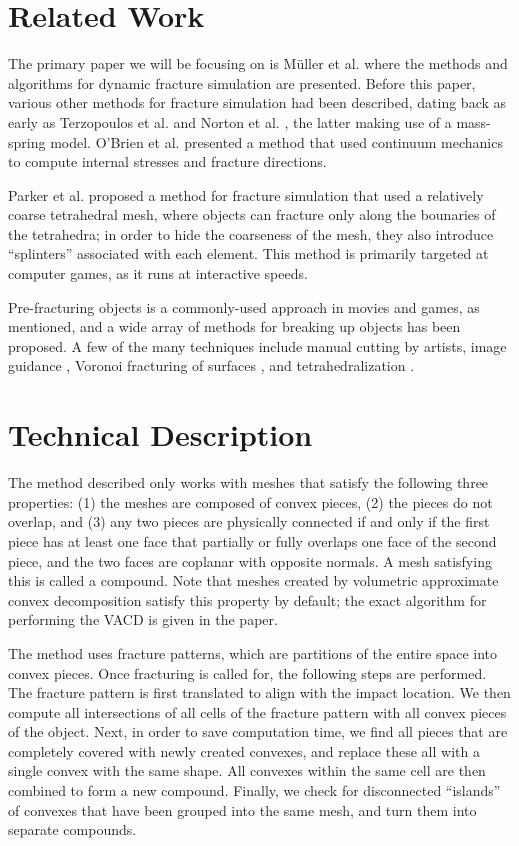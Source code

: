 \documentclass[tog]{acmsiggraph}
\begin{document}
\section{Related Work}

The primary paper we will be focusing on is M\"uller et
al. \cite{Mul13} where the methods and algorithms for dynamic fracture
simulation are presented. Before this paper, various other methods for
fracture simulation had been described, dating back as early as
Terzopoulos et al. \cite{Ter88} and Norton et al. \cite{Nor91}, the
latter making use of a mass-spring model. O'Brien et al. \cite{Obr99}
presented a method that used continuum mechanics to compute internal
stresses and fracture directions.

Parker et al. \cite{Par09} proposed a method for fracture simulation
that used a relatively coarse tetrahedral mesh, where objects can
fracture only along the bounaries of the tetrahedra; in order to hide
the coarseness of the mesh, they also introduce ``splinters''
associated with each element. This method is primarily targeted at
computer games, as it runs at interactive speeds.

Pre-fracturing objects is a commonly-used approach in movies and
games, as mentioned, and a wide array of methods for breaking up
objects has been proposed. A few of the many techniques include manual
cutting by artists, image guidance \cite{Mou05}, Voronoi fracturing of
surfaces \cite{Rag02}, and tetrahedralization \cite{Par09}.

\section{Technical Description}

The method described only works with meshes that satisfy the following
three properties: (1) the meshes are composed of convex pieces, (2)
the pieces do not overlap, and (3) any two pieces are physically
connected if and only if the first piece has at least one face that
partially or fully overlaps one face of the second piece, and the two
faces are coplanar with opposite normals. A mesh satisfying this is
called a compound. Note that meshes created by volumetric approximate
convex decomposition satisfy this property by default; the exact
algorithm for performing the VACD is given in the paper.

The method uses fracture patterns, which are partitions of the entire
space into convex pieces. Once fracturing is called for, the following
steps are performed. The fracture pattern is first translated to align
with the impact location. We then compute all intersections of all
cells of the fracture pattern with all convex pieces of the
object. Next, in order to save computation time, we find all pieces
that are completely covered with newly created convexes, and replace
these all with a single convex with the same shape. All convexes
within the same cell are then combined to form a new
compound. Finally, we check for disconnected ``islands'' of convexes
that have been grouped into the same mesh, and turn them into separate
compounds.
\end{document}
